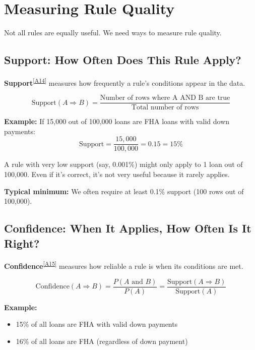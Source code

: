 \documentclass[11pt,a4paper]{article}
\newcommand{\term}[2]{\textcolor{termcolor}{\textbf{#1}}\textsuperscript{\hyperref[#2]{[#2]}}}
\begin{document}
\section{Measuring Rule Quality}

Not all rules are equally useful. We need ways to measure rule quality.

\subsection{Support: How Often Does This Rule Apply?}

\term{Support}{A14} measures how frequently a rule's conditions appear in the data.

\begin{equation}
\text{Support}(A \Rightarrow B) = \frac{\text{Number of rows where A AND B are true}}{\text{Total number of rows}}
\end{equation}

\textbf{Example:} If 15,000 out of 100,000 loans are FHA loans with valid down payments:
\[
\text{Support} = \frac{15,000}{100,000} = 0.15 = 15\%
\]

\begin{infobox}
A rule with very low support (say, 0.001\%) might only apply to 1 loan out of 100,000. Even if it's correct, it's not very useful because it rarely applies.

\textbf{Typical minimum:} We often require at least 0.1\% support (100 rows out of 100,000).
\end{infobox}

\subsection{Confidence: When It Applies, How Often Is It Right?}

\term{Confidence}{A15} measures how reliable a rule is when its conditions are met.

\begin{equation}
\text{Confidence}(A \Rightarrow B) = \frac{P(A \text{ and } B)}{P(A)} = \frac{\text{Support}(A \Rightarrow B)}{\text{Support}(A)}
\end{equation}

\textbf{Example:} 
\begin{itemize}
    \item 15\% of all loans are FHA with valid down payments
    \item 16\% of all loans are FHA (regardless of down payment)
\end{itemize}
\end{document}
